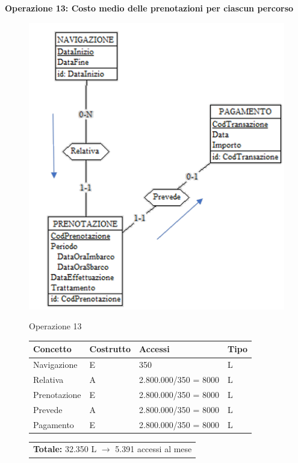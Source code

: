 \documentclass[a4paper, titlepage]{report}
\begin{document}
	\noindent
	\textbf{{\large {Operazione 13: }}}\textbf{Costo medio delle prenotazioni per ciascun percorso}
		 \vspace{0.5cm}
	\begin{figure}[h]
		\centering
		\includegraphics[scale=0.7]{images/SchNav06.png}		
	\end{figure}
	\vspace{0.2cm}
	\begin{figure}[h]
		\centering
		Operazione 13\\
		\begin{tabular}{L{3cm}C{2.5cm}C{4.5cm}C{2.5cm}}
			\rule[-2mm]{0mm}{0.65cm}{}
			\textbf{Concetto} & \textbf{Costrutto} &\textbf{Accessi} & \textbf{Tipo} \\
			\hline\rule[-2mm]{0mm}{0.65cm}{}
			Navigazione & E & 350 & L \\
			\hline\rule[-2mm]{0mm}{0.65cm}{}
			Relativa & A & 2.800.000/350 = 8000 & L \\
			\hline\rule[-2mm]{0mm}{0.65cm}{}
			Prenotazione & E & 2.800.000/350 = 8000 & L \\
			\hline\rule[-2mm]{0mm}{0.65cm}{}
			Prevede & A & 2.800.000/350 = 8000 & L \\
			\hline\rule[-2mm]{0mm}{0.65cm}{}
			Pagamento & E & 2.800.000/350 = 8000 & L \\
		\end{tabular}
		\begin{tabular}{C{13.9cm}}
			\rule[-4mm]{0mm}{1cm}{}	
			 \textbf{Totale:} 32.350 L $\to$ 5.391 accessi al mese
		\end{tabular}
	\end{figure}
	
\end{document}
